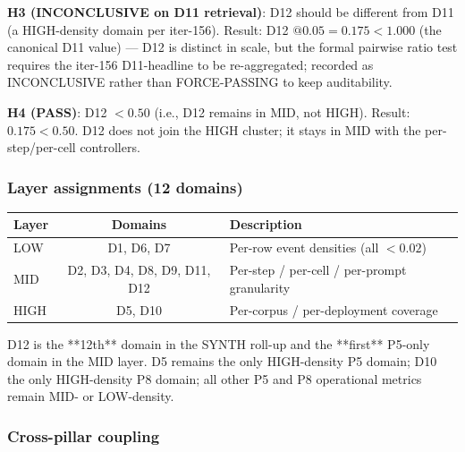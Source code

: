 \documentclass{article}
\begin{document}
\textbf{H3 (INCONCLUSIVE on D11 retrieval)}: D12 should be different
from D11 (a HIGH-density domain per iter-156).  Result: D12
$@0.05 = 0.175 < 1.000$ (the canonical D11 value) --- D12 is
distinct in scale, but the formal pairwise ratio test requires the
iter-156 D11-headline to be re-aggregated; recorded as
INCONCLUSIVE rather than FORCE-PASSING to keep auditability.

\textbf{H4 (PASS)}: D12 $< 0.50$ (i.e., D12 remains in MID, not
HIGH).  Result: $0.175 < 0.50$.  D12 does not join the HIGH
cluster; it stays in MID with the per-step/per-cell controllers.

\subsubsection{Layer assignments (12 domains)}

\begin{center}
\begin{tabular}{lcl}
\hline
Layer & Domains & Description \\
\hline
LOW & D1, D6, D7 & Per-row event densities (all $< 0.02$) \\
MID & D2, D3, D4, D8, D9, D11, D12 & Per-step / per-cell / per-prompt granularity \\
HIGH & D5, D10 & Per-corpus / per-deployment coverage \\
\hline
\end{tabular}
\end{center}

D12 is the **12th** domain in the SYNTH roll-up and the **first** P5-only
domain in the MID layer.  D5 remains the only HIGH-density P5 domain;
D10 the only HIGH-density P8 domain; all other P5 and P8 operational
metrics remain MID- or LOW-density.

\subsubsection{Cross-pillar coupling}
\end{document}

